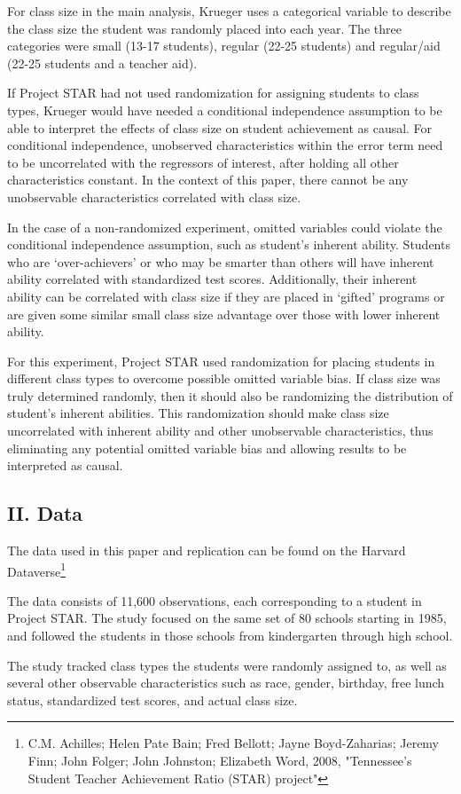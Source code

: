 \documentclass[a4paper,11pt]{article}
\begin{document}
For class size in the main analysis, Krueger uses a categorical variable to describe the class size the student was randomly placed into each year. The three categories were small (13-17 students), regular (22-25 students) and regular/aid (22-25 students and a teacher aid).  \par

If Project STAR had not used randomization for assigning students to class types, Krueger would have needed a conditional independence assumption to be able to interpret the effects of class size on student achievement as causal. For conditional independence, unobserved characteristics within the error term need to be uncorrelated with the regressors of interest, after holding all other characteristics constant. In the context of this paper, there cannot be any unobservable characteristics correlated with class size. \par

In the case of a non-randomized experiment, omitted variables could violate the conditional independence assumption, such as student’s inherent ability. Students who are ‘over-achievers’ or who may be smarter than others will have inherent ability correlated with standardized test scores. Additionally, their inherent ability can be correlated with class size if they are placed in ‘gifted’ programs or are given some similar small class size advantage over those with lower inherent ability. \par

For this experiment, Project STAR used randomization for placing students in different class types to overcome possible omitted variable bias. If class size was truly determined randomly, then it should also be randomizing the distribution of student’s inherent abilities. This randomization should make class size uncorrelated with inherent ability and other unobservable characteristics, thus eliminating any potential omitted variable bias and allowing results to be interpreted as causal. \\

\subsection*{II. Data}
The data used in this paper and replication can be found on the Harvard Dataverse\footnote{C.M. Achilles; Helen Pate Bain; Fred Bellott; Jayne Boyd-Zaharias; Jeremy Finn; John Folger; John Johnston; Elizabeth Word, 2008, "Tennessee's Student Teacher Achievement Ratio (STAR) project"} \par
The data consists of 11,600 observations, each corresponding to a student in Project STAR. The study focused on the same set of 80 schools  starting in 1985, and followed the students in those schools from kindergarten through high school. \par
The study tracked class types the students were randomly assigned to, as well as several other observable characteristics such as race, gender, birthday, free lunch status, standardized test scores, and actual class size.\par
\end{document}
